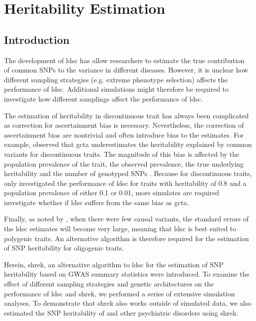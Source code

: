 \chapter{Heritability Estimation}
\label{heritabilityChapter}
	\section{Introduction}
	The development of \gls{ldsc} \citep{Bulik-Sullivan2015} has allow researchers to estimate the true contribution of common \glspl{SNP} to the variance in different diseases.	
	However, it is unclear how different sampling strategies (e.g. extreme phenotype selection) affects the performance of \gls{ldsc}.
	Additional simulations might therefore be required to investigate how different samplings affect the performance of \gls{ldsc}.
	
	The estimation of heritability in discontinuous trait has always been complicated as correction for ascertainment bias is necessary.
	Nevertheless, the correction of ascertainment bias are nontrivial and often introduce bias to the estimates. 
	For example, \citet{Golan2014} observed that \gls{gcta} underestimates the heritability explained by common variants for discontinuous traits.
	The magnitude of this bias is affected by the population prevalence of the trait, the observed prevalence, the true underlying heritability and the number of genotyped \glspl{SNP} \citep{Golan2014}.
	Because for discontinuous traits, \citet{Bulik-Sullivan2015} only investigated the performance of \gls{ldsc} for traits with heritability of 0.8 and a population prevalence of either 0.1 or 0.01, more simulates are required investigate whether if \gls{ldsc} suffers from the same bias as \gls{gcta}.
	
	Finally, as noted by \citet{Bulik-Sullivan2015}, when there were few causal variants, the standard errors of the \gls{ldsc} estimates will become very large, meaning that \gls{ldsc} is best suited to polygenic traits.
	An alternative algorithm is therefore required for the estimation of \gls{SNP} heritability for oligogenic traits.
	
	Herein, \gls{shrek}, an alternative algorithm to \gls{ldsc} for the estimation of \gls{SNP} heritability based on \gls{GWAS} summary statistics were introduced.
	To examine the effect of different sampling strategies and genetic architectures on the performance of \gls{ldsc} and \gls{shrek}, we performed a series of extensive simulation analyses.
	To demonstrate that \gls{shrek} also works outside of simulated data, we also estimated the \gls{SNP} heritability of  and other psychiatric disorders using \gls{shrek}.
	
